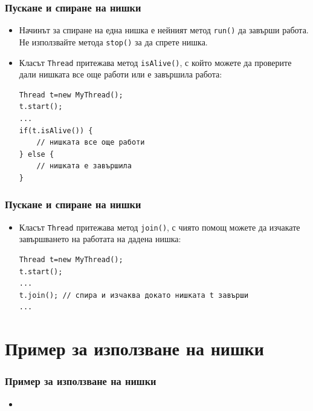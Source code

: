 \documentclass[ignorenonframetext, hyperref=unicode,compress]{beamer}
\begin{document}
\begin{frame}[containsverbatim]
\frametitle{Пускане и спиране на нишки}
\begin{itemize}
\item Начинът за спиране на една нишка е нейният метод \lstinline{run()} да
завърши работа. Не използвайте метода \lstinline{stop()} за да спрете нишка.
\item Класът \lstinline{Thread} притежава метод \lstinline{isAlive()}, с който
можете да проверите дали нишката все още работи или е завършила работа:
\begin{lstlisting}
Thread t=new MyThread();
t.start();
...
if(t.isAlive()) {
	// нишката все още работи
} else {
	// нишката е завършила
}
\end{lstlisting}
\end{itemize}
\end{frame}

\begin{frame}[containsverbatim]
\frametitle{Пускане и спиране на нишки}
\begin{itemize}
\item Класът \lstinline{Thread} притежава метод \lstinline{join()}, с чиято
помощ можете да изчакате завършването на работата на дадена нишка:
\begin{lstlisting}
Thread t=new MyThread();
t.start();
...
t.join(); // спира и изчаква докато нишката t завърши
...
\end{lstlisting}
\end{itemize}
\end{frame}

\section{Пример за използване на нишки}
\begin{frame}[containsverbatim]
\frametitle{Пример за използване на нишки}
\begin{itemize}
\item 
\end{itemize}
\end{frame}
\end{document}
